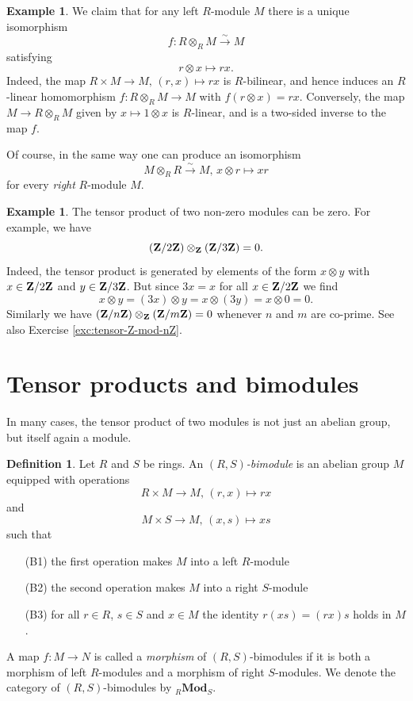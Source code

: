 \documentclass[11pt]{amsbook}
\newcommand{\isomto}{\overset{\sim}{\to}}
\DeclareMathOperator\Mod{{\bf{Mod}}}
\def\Mod{\mathbf{Mod}}
\theoremstyle{plain}
\theoremstyle{definition}
\newtheorem{definition}[theorem]{Definition}
\newtheorem{example}[theorem]{Example}
\begin{document}
\begin{example}\label{exa:tensor-with-R}
We claim that for any left $R$-module $M$ there is a unique isomorphism 
\[
	f\colon R\otimes_R M \isomto M
\]
satisfying
\[
	r\otimes x \mapsto rx.
\]
Indeed, the map $R\times M \to M,\, (r,x) \mapsto rx$
is $R$-bilinear, and hence induces an $R$-linear homomorphism
$f\colon R\otimes_R M \to M$ with $f(r\otimes x)=rx$. Conversely, the map
$M \to R\otimes_R M$ given by $x \mapsto 1\otimes x$
is $R$-linear, and is a two-sided inverse to the map $f$.

Of course, in the same way one can produce an isomorphism
\[
	 M\otimes_R R \isomto M,\, x \otimes r \mapsto xr
\]
for every \emph{right} $R$-module $M$.
\end{example}

\begin{example}
The tensor product of two non-zero modules can be zero. For example, we have
\[
	({\mathbf{Z}}/2{\mathbf{Z}}) \otimes_{\mathbf{Z}} ({\mathbf{Z}}/3{\mathbf{Z}}) = 0.
\]
Indeed, the tensor product is generated by elements of the form $x\otimes y$ with $x\in {\mathbf{Z}}/2{\mathbf{Z}}$ and $y\in {\mathbf{Z}}/3{\mathbf{Z}}$. But since
$3x=x$ for all $x\in {\mathbf{Z}}/2{\mathbf{Z}}$ we find 
\[
	x\otimes y = (3x) \otimes y  = x \otimes (3y) = x\otimes 0 =  0.
\]
Similarly we have $({\mathbf{Z}}/n{\mathbf{Z}})\otimes_{\mathbf{Z}} ({\mathbf{Z}}/m{\mathbf{Z}})=0$ whenever $n$ and $m$ are co-prime. See also Exercise \ref{exc:tensor-Z-mod-nZ}.
\end{example}


\section{Tensor products and bimodules}

In many cases, the tensor product of two modules is not just an abelian group, but itself again a module. 

\begin{definition}
Let $R$ and $S$ be rings.
An \emph{$(R,S)$-bimodule} is an abelian group $M$ equipped with operations
\[
	R\times M \to M,\, (r,x) \mapsto rx
\]
and 
\[
	M \times S \to M,\, (x,s) \mapsto xs
\]
such that 
\begin{enumerate}
\item[(B1)] the first operation makes $M$ into a left $R$-module 
\item[(B2)] the second operation makes $M$ into a right $S$-module
\item[(B3)] for all $r\in R$, $s\in S$ and $x\in M$ the identity $r(xs)=(rx)s$ holds in $M$.
\end{enumerate}
A map  $f\colon M \to N$  is called a \emph{morphism} of $(R,S)$-bimodules if it is both a morphism
of left $R$-modules and a morphism of right $S$-modules. We denote the category of $(R,S)$-bimodules by ${}_R\Mod_S$.
\end{definition}
\end{document}

